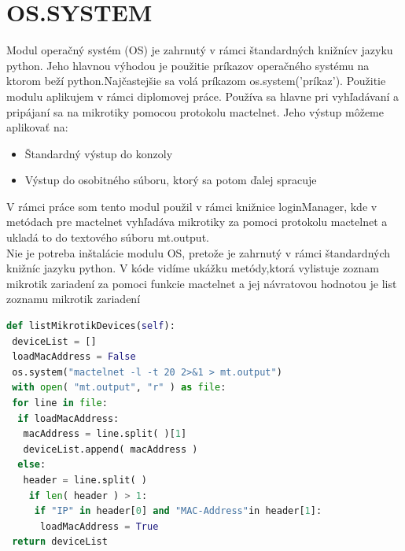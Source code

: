 \section{OS.SYSTEM}
Modul operačný systém (OS) \cite{OS} je zahrnutý v rámci štandardných knižnícv jazyku python. Jeho hlavnou výhodou je použitie príkazov operačného systému na ktorom beží python.Najčastejšie sa volá príkazom os.system('príkaz').
Použitie modulu aplikujem v rámci diplomovej práce. Používa sa hlavne pri vyhľadávaní a pripájaní sa na mikrotiky pomocou protokolu mactelnet. Jeho výstup môžeme aplikovať na:\begin{itemize}
\item Štandardný výstup do konzoly
\item Výstup do osobitného súboru, ktorý sa potom ďalej spracuje
\end{itemize}
V rámci práce som tento modul použil v rámci knižnice loginManager, kde v metódach pre mactelnet vyhľadáva mikrotiky za pomoci protokolu mactelnet a ukladá to do textového súboru mt.output. \\
Nie je potreba inštalácie modulu  OS, pretože je zahrnutý v rámci štandardných knižníc jazyku python. V kóde vidíme ukážku metódy,ktorá vylistuje zoznam mikrotik zariadení za pomoci funkcie mactelnet a jej návratovou hodnotou je list zoznamu mikrotik zariadení
\begin{lstlisting}[language=python, frame=single, caption=Metóda na vyhľadanie MAC adries mikrotikov, captionpos=b]
def listMikrotikDevices(self):
 deviceList = []
 loadMacAddress = False
 os.system("mactelnet -l -t 20 2>&1 > mt.output")
 with open( "mt.output", "r" ) as file:
 for line in file:
  if loadMacAddress:
   macAddress = line.split( )[1]
   deviceList.append( macAddress )
  else:
   header = line.split( )
    if len( header ) > 1:
     if "IP" in header[0] and "MAC-Address"in header[1]:
      loadMacAddress = True
 return deviceList
\end{lstlisting}
